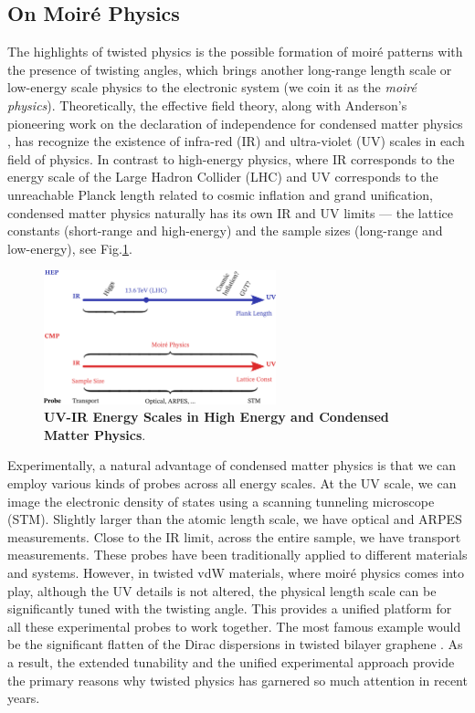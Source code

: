 \subsection{On Moir\'e Physics}
The highlights of twisted physics is the possible formation of moiré patterns with the presence of twisting angles, which brings another long-range length scale or low-energy scale physics to the electronic system (we coin it as the \emph{moir\'e physics}). Theoretically, the effective field theory, along with Anderson's pioneering work on the declaration of independence for condensed matter physics \cite{anderson1972more}, has recognize the existence of infra-red (IR) and ultra-violet (UV) scales in each field of physics. In contrast to high-energy physics, where IR corresponds to the energy scale of the Large Hadron Collider (LHC) and UV corresponds to the unreachable Planck length related to cosmic inflation and grand unification, condensed matter physics naturally has its own IR and UV limits --- the lattice constants (short-range and high-energy) and the sample sizes (long-range and low-energy), see Fig.\ref{fig:HEP_vs_CMP}.
\begin{figure}[!htp]
    \centering
    \includegraphics[width=0.6\textwidth]{figures/Introduction/HEP_vs_CMP.png}
    \caption{\textbf{UV-IR Energy Scales in High Energy and Condensed Matter Physics}.}
    \label{fig:HEP_vs_CMP}
\end{figure}

Experimentally, a natural advantage of condensed matter physics is that we can employ various kinds of probes across all energy scales. At the UV scale, we can image the electronic density of states using a scanning tunneling microscope (STM). Slightly larger than the atomic length scale, we have optical and ARPES measurements. Close to the IR limit, across the entire sample, we have transport measurements. These probes have been traditionally applied to different materials and systems. However, in twisted vdW materials, where moiré physics comes into play, although the UV details is not altered, the physical length scale can be significantly tuned with the twisting angle. This provides a unified platform for all these experimental probes to work together. The most famous example would be the significant flatten of the Dirac dispersions in twisted bilayer graphene \cite{bistritzer2011moire,cao2018correlated}. As a result, the extended tunability and the unified experimental approach provide the primary reasons why twisted physics has garnered so much attention in recent years.





